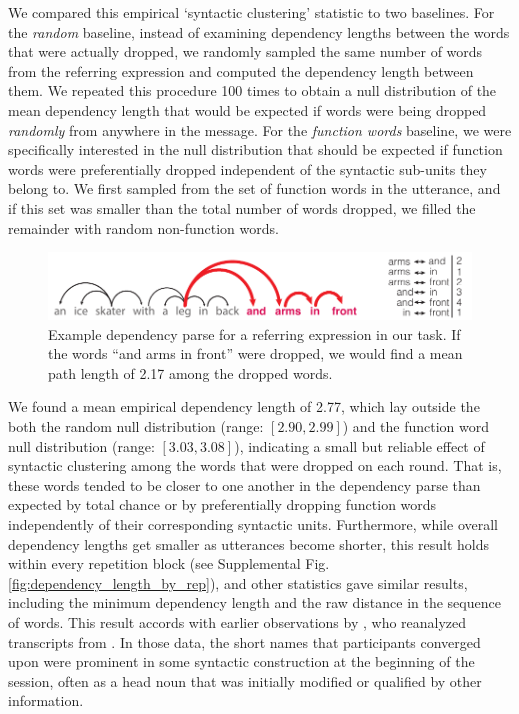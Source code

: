 \documentclass[alpha-refs]{wiley-article}
\begin{document}
We compared this empirical `syntactic clustering' statistic to two baselines.
For the \emph{random} baseline, instead of examining dependency lengths between the words that were actually dropped, we randomly sampled the same number of words from the referring expression and computed the dependency length between them.
We repeated this procedure 100 times to obtain a null distribution of the mean dependency length that would be expected if words were being dropped \emph{randomly} from anywhere in the message.
For the \emph{function words} baseline, we were specifically interested in the null distribution that should be expected if function words were preferentially dropped independent of the syntactic sub-units they belong to.
We first sampled from the set of function words in the utterance, and if this set was smaller than the total number of words dropped, we filled the remainder with random non-function words.

\begin{figure}[t!]
\centering
\vspace{-1em}
\includegraphics[scale=.75]{dependency.pdf}
\caption{Example dependency parse for a referring expression in our task. If the words ``and arms in front'' were dropped, we would find a mean path length of 2.17 among the dropped words.}
\label{fig:dependency}
\end{figure}

We found a mean empirical dependency length of 2.77, which lay outside the both the random null distribution (range: $[2.90, 2.99]$) and the function word null distribution (range: $[3.03, 3.08]$), indicating a small but reliable effect of syntactic clustering among the words that were dropped on each round.
That is, these words tended to be closer to one another in the dependency parse than expected by total chance or by preferentially dropping function words independently of their corresponding syntactic units.
Furthermore, while overall dependency lengths get smaller as utterances become shorter, this result holds within every repetition block (see Supplemental Fig. \ref{fig:dependency_length_by_rep}), and other statistics gave similar results, including the minimum dependency length and the raw distance in the sequence of words.
This result accords with earlier observations by \cite{Carroll80_NamingHedges}, who reanalyzed transcripts from \cite{KraussWeinheimer64_ReferencePhrases}. 
In those data, the short names that participants converged upon were prominent in some syntactic construction at the beginning of the session, often as a head noun that was initially modified or qualified by other information.
\end{document}
